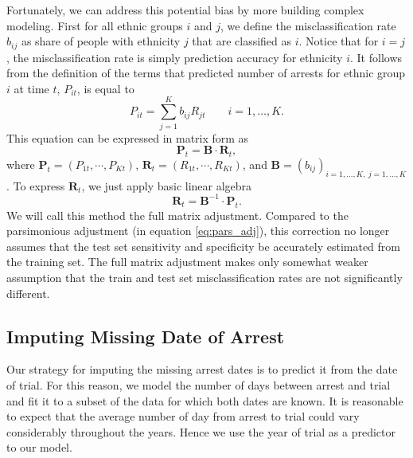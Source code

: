 Fortunately, we can address this potential bias by more building complex modeling.
First for all ethnic groups $i$ and $j$, we define the misclassification rate $b_{ij}$ as share of people with ethnicity $j$ that are classified as $i$.
Notice that for $i = j$, the misclassification rate is simply prediction accuracy for ethnicity $i$.
It follows from the definition of the terms that predicted number of arrests for ethnic group $i$ at time $t$,  $P_{it}$, is equal to 
\begin{equation}
P_{it}  = \sum_{j = 1}^{K} b_{ij} R_{jt} \qquad i = 1, \dots, K.
\end{equation}
This equation can be expressed in matrix form as
\begin{equation}
 \mathbf{P}_t = \mathbf{B} \cdot \mathbf{R}_t,
\end{equation}
where $\mathbf{P}_t = \left(P_{1t}, \cdots, P_{Kt} \right)$, $\mathbf{R}_t = \left(R_{1t}, \cdots, R_{Kt} \right)$, and $\mathbf{B} = \left(b_{ij}\right)_{i = 1, \dots, K,\:j = 1, \dots, K}$.
To express $\mathbf{R}_t$, we just  apply basic linear algebra
\begin{equation} \label{eq:full_matrix_adj}
\mathbf{R}_t  = \mathbf{B}^{-1} \cdot  \mathbf{P}_t.
\end{equation}
We will call this method the full matrix adjustment. Compared to the parsimonious adjustment (in equation \ref{eq:pars_adj}), this correction no longer assumes that the test set sensitivity and specificity be accurately estimated  from the training set.  The full matrix adjustment
makes only somewhat weaker assumption that the train and test set misclassification rates are not significantly different. 







\subsection{Imputing Missing Date of Arrest} \label{subsec:imputing_missing_date}
Our strategy for imputing the missing arrest dates is to  predict it from the date of trial. For this reason, we model the number of days between arrest and trial and fit it to a subset of the data for which both dates are known. It  is reasonable to expect that the average number of day from  arrest to trial could  vary considerably throughout the years.    %
Hence we use the year of trial as a predictor to our model. 

